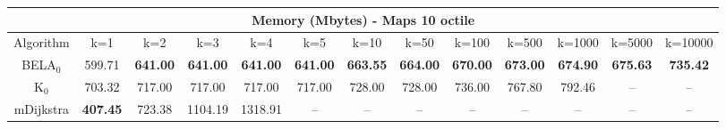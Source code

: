 \begin{tabular}{c|cccccccccccc}\toprule
\multicolumn{13}{c}{Memory (Mbytes) - Maps 10 octile}\\ \midrule
Algorithm & k=1 & k=2 & k=3 & k=4 & k=5 & k=10 & k=50 & k=100 & k=500 & k=1000 & k=5000 & k=10000 \\ \midrule
BELA$_0$ & 599.71 & \textbf{641.00} & \textbf{641.00} & \textbf{641.00} & \textbf{641.00} & \textbf{663.55} & \textbf{664.00} & \textbf{670.00} & \textbf{673.00} & \textbf{674.90} & \textbf{675.63} & \textbf{735.42} \\
K$_0$ & 703.32 & 717.00 & 717.00 & 717.00 & 717.00 & 728.00 & 728.00 & 736.00 & 767.80 & 792.46 & -- & -- \\
mDijkstra & \textbf{407.45} & 723.38 & 1104.19 & 1318.91 & -- & -- & -- & -- & -- & -- & -- & -- \\ \bottomrule 
\end{tabular}
